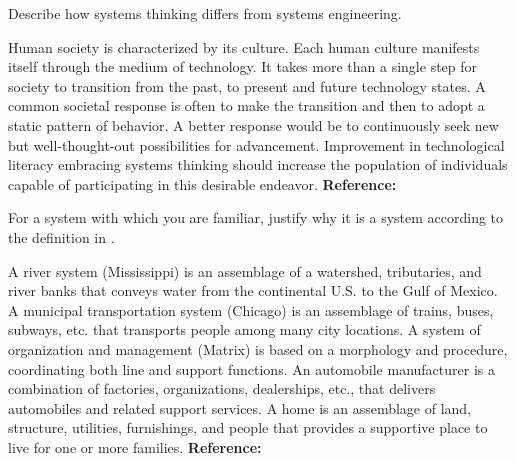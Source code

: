 \begin{exercises}
    \begin{exercise}
    \label{sea-1-26}
        Describe how systems thinking differs from systems engineering.
    \end{exercise}
    \begin{solution}
        Human society is characterized by its culture. Each human culture manifests itself through the medium of technology. It takes more than a single step for society to transition from the past, to present and future technology states. A common societal response is often to make the transition and then to adopt a static pattern of behavior. A better response would be to continuously seek new but well-thought-out possibilities for advancement. Improvement in technological literacy embracing systems thinking should increase the population of individuals capable of participating in this desirable endeavor. \textbf{Reference:}
    \end{solution}
    
    \begin{exercise}
    \label{sea-1-1}
        For a system with which you are familiar, justify why it is a system according to the definition in .
    \end{exercise}
    \begin{solution}
        A river system (Mississippi) is an assemblage of a watershed, tributaries, and river banks that conveys water from the continental U.S. to the Gulf of Mexico. A municipal transportation system (Chicago) is an assemblage of trains, buses, subways, etc. that transports people among many city locations. A system of organization and management (Matrix) is based on a morphology and procedure, coordinating both line and support functions. An automobile manufacturer is a combination of factories, organizations, dealerships, etc., that delivers automobiles and related support services. A home is an assemblage of land, structure, utilities, furnishings, and people that provides a supportive place to live for one or more families. \textbf{Reference:}
    \end{solution}
    

\end{exercises}
